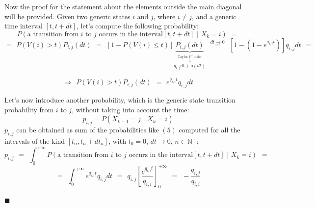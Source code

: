 \documentclass[12pt,a4paper]{article}
\begin{document}
\bigskip\noindent
Now the proof for the statement about the elements outside the main diagonal will be provided. Given two generic states $i$ and $j$, where $i\neq j$, and a generic time interval $\left[ t, t+dt\right]$, let's compute the following probability:
\begin{equation}
P\left( \textrm{a transition from }i\textrm{ to }j 
\textrm{ occurs in the interval} \left[ t, t+dt\right]
\hspace{4pt}|\hspace{4pt}
X_k=i
\right)
\hspace{5pt}
=
\end{equation}
$$
=
\hspace{5pt}
P\left( V(i)>t\right)
P_{i,j}(dt)
\hspace{5pt}
=
\hspace{5pt}
\left[1-P\left( V(i)\leq t\right)\right]
\underbrace{P_{i,j}(dt)}_{
\overset{\textrm{Taylor }1^{\textrm{st}}\textrm{ order}}
{\overset{\Downarrow}{q_{i,j}dt+o(dt)}}}
\hspace{5pt}
\overset{dt\rightarrow 0}{=}
\hspace{5pt}
\left[1-\left(1-e^{q_{i,i} t}\right)\right]q_{i,j}dt
\hspace{5pt}
=
$$
\begin{large}
$$
\Rightarrow
\hspace{5pt}
P\left( V(i)>t\right)
P_{i,j}(dt)
\hspace{5pt}
=
\hspace{5pt}
e^{q_{i,i} t}q_{i,j}dt
$$
\end{large}

\noindent 
Let's now introduce another probability, which is the generic state transition probability from $i$ to $j$, without taking into account the time:
$$
p_{i,j}=P(X_{k+1}=j \hspace{4pt}|\hspace{4pt} X_k=i)
$$
$p_{i,j}$ can be obtained as sum of the probabilities like $(5)$ computed for all the intervals of the kind 
$[t_n,t_n+dt_n]$, with $t_0=0$, $dt \rightarrow 0$, $n\in \mathbb{N}^+$:
$$
p_{i,j}
\hspace{5pt}
=
\hspace{5pt}
\int_0^{+\infty}{P\left( \textrm{a transition from }i\textrm{ to }j 
\textrm{ occurs in the interval} \left[ t, t+dt\right]
\hspace{4pt}|\hspace{4pt}
X_k=i
\right)} 
\hspace{5pt}
=
$$
$$
=
\hspace{5pt}
\int_0^{+\infty}{
e^{q_{i,i} t}q_{i,j}dt
}
\hspace{5pt}
=
\hspace{5pt}
q_{i,j}\left[ \frac{e^{q_{i,i}t}}{q_{i,i}}\right]_0^{+\infty}
\hspace{5pt}
=
\hspace{5pt}
-\frac{q_{i,j}}{q_{i,i}}
$$
\begin{flushright}
$\blacksquare$
\end{flushright}
\newpage
\end{document}
